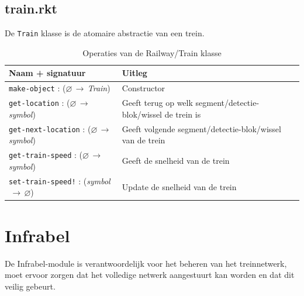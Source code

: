 \documentclass[a4paper, 11pt]{article}
\newcommand{\naar}{\,$\rightarrow$\,}
\renewcommand{\empty}{$\varnothing$}
\newcommand{\<}{\scriptsize\textless\normalsize}
\renewcommand{\>}{\scriptsize\textgreater\normalsize}
\begin{document}
\subsection{train.rkt} %
De \texttt{Train} klasse is de atomaire abstractie van een trein.
\begin{table}[H]
	\begin{center}
		{
		\begin{tabular}{|l l|}
			\hline
			\textbf{Naam + signatuur} & \textbf{Uitleg}\\
			\hline
			\texttt{make-object} : (\empty \naar \textit{Train}) & Constructor\\
			\hline
			\texttt{get-location} : (\empty \naar \textit{symbol}) & Geeft terug op welk segment/detectie-blok/wissel de trein is\\
			\texttt{get-next-location} : (\empty \naar \textit{symbol}) & Geeft volgende segment/detectie-blok/wissel van de trein\\
			\texttt{get-train-speed} : (\empty \naar \textit{symbol}) & Geeft de snelheid van de trein\\
			\texttt{set-train-speed!} : (\textit{symbol} \naar \empty) & Update de snelheid van de trein\\
			\hline
		\end{tabular}}
		\caption{Operaties van de Railway/Train klasse}
	\end{center}
\end{table}

\newpage
\section{Infrabel} %
De Infrabel-module is verantwoordelijk voor het beheren van het treinnetwerk, moet ervoor zorgen dat het volledige netwerk aangestuurt kan worden en dat dit veilig gebeurt.\\\\

\end{document}
